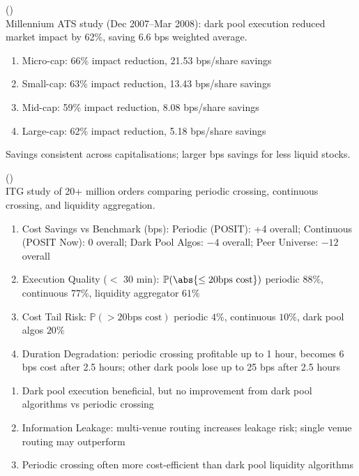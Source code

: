 \begin{remark}  (\cite{qsg_2008})\\
Millennium ATS study (Dec 2007--Mar 2008): dark pool execution reduced market impact by 62\%, saving 6.6 bps weighted average.
\begin{enumerate}[label=\roman*.]
\setlength{\itemsep}{0pt}
\item Micro-cap: 66\% impact reduction, 21.53 bps/share savings
\item Small-cap: 63\% impact reduction, 13.43 bps/share savings
\item Mid-cap: 59\% impact reduction, 8.08 bps/share savings
\item Large-cap: 62\% impact reduction, 5.18 bps/share savings
\end{enumerate}
Savings consistent across capitalisations; larger bps savings for less liquid stocks.
\end{remark}

\begin{remark}  (\cite{domowitz_finkelshteyn_yegerman_2008})\\
ITG study of 20+ million orders comparing periodic crossing, continuous crossing, and liquidity aggregation.
\begin{enumerate}[label=\roman*.]
\setlength{\itemsep}{0pt}
\item Cost Savings vs Benchmark (bps): Periodic (POSIT): +4 overall; Continuous (POSIT Now): 0 overall; Dark Pool Algos: $-4$ overall; Peer Universe: $-12$ overall
\item Execution Quality ($<$ 30 min): $\mathbb{P} (\abs{\leq 20 \text{bps cost}})$  periodic $88\%$, continuous $77\%$, liquidity aggregator $61\%$
\item Cost Tail Risk: $\mathbb{P} (> 20 \text{bps cost})$ periodic $4\%$, continuous $10\%$, dark pool algos $20\%$
\item Duration Degradation: periodic crossing profitable up to 1 hour, becomes 6 bps cost after 2.5 hours; other dark pools lose up to 25 bps after 2.5 hours
\end{enumerate}
\end{remark}

\begin{remark} 
\begin{enumerate}[label=\roman*.]
\setlength{\itemsep}{0pt}
\item Dark pool execution beneficial, but no improvement from dark pool algorithms vs periodic crossing
\item Information Leakage: multi-venue routing increases leakage risk; single venue routing may outperform
\item Periodic crossing often more cost-efficient than dark pool liquidity algorithms
\end{enumerate}
\end{remark}

